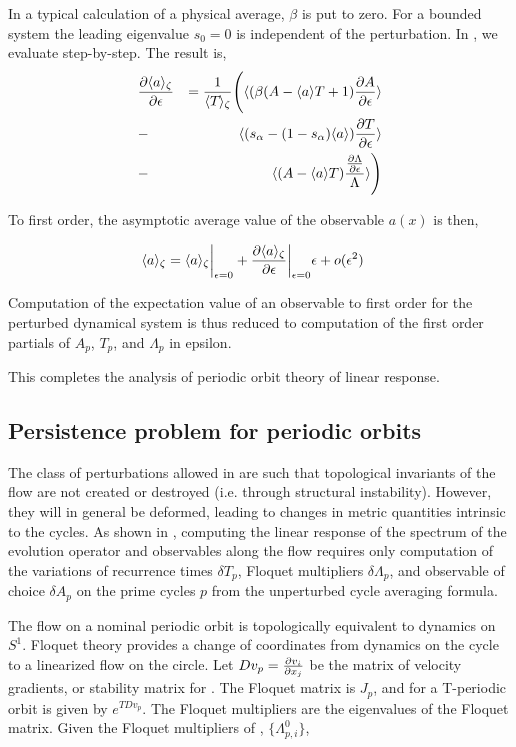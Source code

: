 \documentclass[aps,pre,
                showpacs,
                twocolumn,
                groupedaddress,
                superscriptaddress,
                floatfix]{revtex4-1}
\begin{document}
In a typical calculation of a physical average, $\beta$ is put to zero.
For a bounded system the leading eigenvalue $s_{0}=0$ is independent of
the perturbation. In , we evaluate
 step-by-step. The result is,
\begin{eqnarray*}
&\frac{\partial \langle {a} \rangle_{\zeta}}{\partial \epsilon}
& = \frac{1}{\langle {{\ensuremath{T_{}}}} \rangle_{\zeta}}
        \Bigg(
    \langle {(\beta(A-\langle {a} \rangle T + 1)\frac{\partial A}{\partial\epsilon}} \rangle \\
&-& \langle {(s_{\alpha}-(1-s_{\alpha})\langle {a} \rangle)\frac{\partial T}{\partial\epsilon}} \rangle  \\
&-& \langle {(A-\langle {a} \rangle T) \frac{\frac{\partial\Lambda}{\partial\epsilon}}{\Lambda}} \rangle
        \Bigg)
\end{eqnarray*}

To first order, the asymptotic average value of the observable $a(x)$ is then,

\begin{eqnarray*}
& \langle {a} \rangle_{\zeta} = \langle {a} \rangle_{\zeta} \bigg\rvert_{\epsilon = 0} + \frac{\partial \langle {a} \rangle_{\zeta}}{\partial \epsilon} \bigg\rvert_{\epsilon = 0} \epsilon + o(\epsilon^{2})
\end{eqnarray*}

Computation of the expectation value of an observable to first order for the perturbed dynamical system  is thus reduced to computation of the first order partials of $A_{p}$, $T_{p}$, and $\Lambda_{p}$ in epsilon. 

This completes the analysis of periodic orbit theory of linear response.

\subsection{Persistence problem for periodic orbits}
The class of perturbations allowed in  are such that topological invariants of the flow are not created or destroyed (i.e. through structural instability). However, they will in general be deformed, leading to changes in metric quantities intrinsic to the cycles. As shown in , computing the linear response of the spectrum of the evolution operator and observables along the flow requires only computation of the variations of recurrence times $\delta T_{p}$, Floquet multipliers $\delta \Lambda_{p}$, and observable of choice $\delta A_{p}$ on the prime cycles $p$ from the unperturbed cycle averaging formula. 

\par The flow on a nominal periodic orbit is topologically equivalent to dynamics on $S^{1}$. Floquet theory provides a change of coordinates from dynamics on the cycle to a linearized flow on the circle. Let $Dv_{p} = \frac{\partial v_{i}}{\partial x_{j}}$ be the matrix of velocity gradients, or stability matrix for . The Floquet matrix is $J_{p}$, and for a T-periodic orbit is given by $e^{T Dv_{p}}$. The Floquet multipliers are the eigenvalues of the Floquet matrix. Given the Floquet multipliers of , ${\lbrace \Lambda_{p,i}^{0} \rbrace}$,
\end{document}
